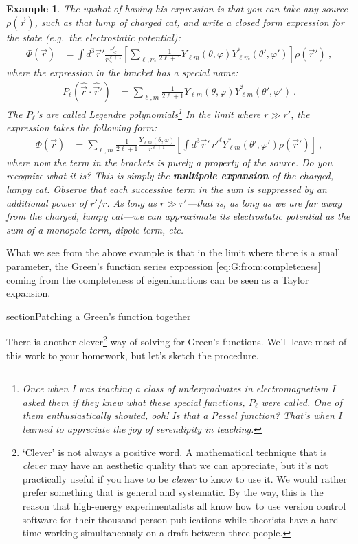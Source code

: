 \documentclass[
  11pt,
	colorful,
	raggedright,
]{tufte-style-thesis-flip}
\newtheorem{example}{Example}[section]
\begin{document}
\begin{example}
The upshot of having his expression is that you can take \emph{any} source $\rho(\vec{r})$, such as that lump of charged cat, and write a closed form expression for the state (e.g.\ the electrostatic potential):
\begin{align}
  \Phi(\vec{r})
  &=
  \int d^3 \vec{r}'
  \frac{r_<^\ell}{r_>^{\ell+1}}
  \left[
    \sum_{\ell, m}
    \frac{1}{2\ell+1}
    Y_{\ell m}(\theta, \varphi)
    Y_{\ell m}^*(\theta', \varphi')
  \right]
  \rho(\vec{r}') \ ,
\end{align}
where the expression in the bracket has a special name:
\begin{align}
  P_\ell(\hat{\vec{r}}\cdot\hat{\vec{r}}')
  &=
  \sum_{\ell, m}
    \frac{1}{2\ell+1}
    Y_{\ell m}(\theta, \varphi)
    Y_{\ell m}^*(\theta', \varphi') \ .
\end{align}
The $P_\ell$'s are called Legendre polynomials\footnote{Once when I was teaching a class of undergraduates in electromagnetism I asked them if they knew what these special functions, $P_\ell$ were called. One of them enthusiastically shouted, \emph{ooh! Is that a Pessel function}? That's when I learned to appreciate the joy of serendipity in teaching.} In the limit where $r\gg r'$, the expression takes the following form:
\begin{align}
  \Phi(\vec{r})
  &=
  \sum_{\ell, m}
  \frac{1}{2\ell+1}
  \frac{Y_{\ell m}(\theta, \varphi)}{r^{\ell+1}}
  \left[\int d^3 \vec{r}'
      \, r'^{\ell}
        Y_{\ell m}^*(\theta', \varphi')
        \rho(\vec{r}')\right] \ ,
\end{align}
where now the term in the brackets is purely a property of the source. Do you recognize what it is? This is simply the \textbf{multipole expansion} of the charged, lumpy cat. Observe that each successive term in the sum is suppressed by an additional power of $r'/r$. As long as $r\gg r'$---that is, as long as we are far away from the charged, lumpy cat---we can approximate its electrostatic potential as the sum of a monopole term, dipole term, etc. 
\end{example}
What we see from the above example is that in the limit where there is a small parameter, the Green's function series expression \eqref{eq:G:from:completeness} coming from the completeness of eigenfunctions can be seen as a Taylor expansion.


section{Patching a Green's function together}
\label{sec:patching}

There is another clever\footnote{`Clever' is not always a positive word. A mathematical technique that is \emph{clever} may have an aesthetic quality that we can appreciate, but it's not practically useful if you have to be \emph{clever} to know to use it. We would rather prefer something that is general and systematic. By the way, this is the reason that high-energy experimentalists all know how to use version control software for their thousand-person publications while theorists have a hard time working simultaneously on a draft between three people.} way of solving for Green's functions. We'll leave most of this work to your homework, but let's sketch the procedure. 
\end{document}
